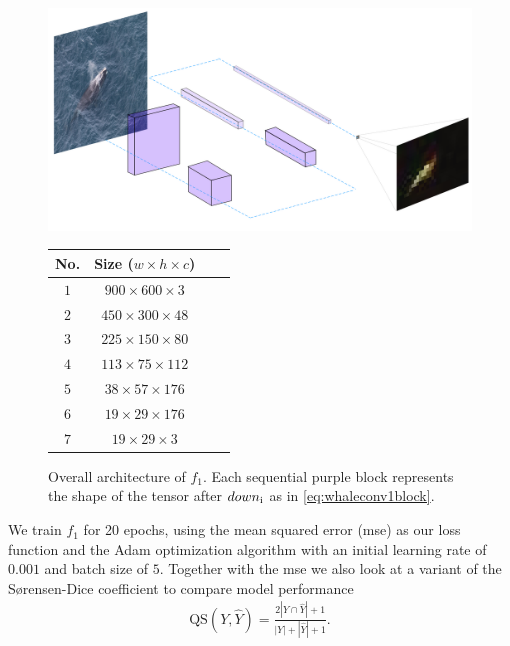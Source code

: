 \documentclass{IET}%
\begin{document}
\begin{figure}
\centering
\begin{minipage}[t]{.7\textwidth}
\centering
\vspace{0pt}
\centering
\includegraphics[width=\textwidth]{images/fcn/deconv2.png}
\label{fig:nn}
\caption{Overall architecture of $f_1$. Each sequential purple block represents the shape of the tensor after $down\textsubscript{i}$ as in \ref{eq:whaleconv1block}.}
\end{minipage}\hfill
\begin{minipage}[t]{.3\textwidth}
\centering
\vspace{40pt}
\begin{tabular}{cc|cc}
  No. & Size ($w\times h\times c$) &\\
    \hline
    \hline
    $1$ & $900 \times 600 \times 3$  & \\
    $2$ & $450 \times 300 \times 48$ &  \\
    $3$ & $225 \times 150 \times 80$ & \\ 
    $4$ & $113 \times 75 \times 112$ &\\
    $5$ & $38 \times 57 \times 176$ &\\
    $6$ &  $19 \times 29 \times 176$ &\\
    $7$ &  $19 \times 29 \times 3$ &\\
\end{tabular}
\end{minipage}
\end{figure}
We train $f_1$ for 20 epochs, using the mean squared error (mse) as our loss function and the Adam optimization algorithm with an initial learning rate of $0.001$ and batch size of $5$. Together with the mse we also look at a variant of the S{\o}rensen-Dice coefficient to compare model performance \cite{sorensen1948method}
\begin{align}
\text{QS}(Y,\hat{Y})={\frac {2|Y\cap \hat{Y}| + 1}{|Y|+|\hat{Y}|+1}}.
\end{align}
\end{document}
